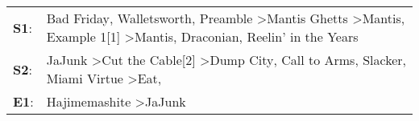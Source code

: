 \begin{supertabular}{p{0.03\textwidth}p{0.92\textwidth}}
 \textbf{S1}:  &  Bad Friday\textsuperscript{}, \enspace Walletsworth\textsuperscript{}, \enspace Preamble\textsuperscript{} \textgreater \enspace Mantis Ghetts\textsuperscript{} \textgreater \enspace Mantis\textsuperscript{}, \enspace Example 1[1]\textsuperscript{} \textgreater \enspace Mantis\textsuperscript{}, \enspace Draconian\textsuperscript{}, \enspace Reelin' in the Years\textsuperscript{}  \enspace  \\
 \textbf{S2}:  &                                                          JaJunk\textsuperscript{} \textgreater \enspace Cut the Cable[2]\textsuperscript{} \textgreater \enspace Dump City\textsuperscript{}, \enspace Call to Arms\textsuperscript{}, \enspace Slacker\textsuperscript{}, \enspace Miami Virtue\textsuperscript{} \textgreater \enspace Eat\textsuperscript{}, \textsuperscript{}  \enspace  \\
 \textbf{E1}:  &                                                                                                                                                                                                                                                                                                                  Hajimemashite\textsuperscript{} \textgreater \enspace JaJunk\textsuperscript{}  \enspace  \\
\end{supertabular}
